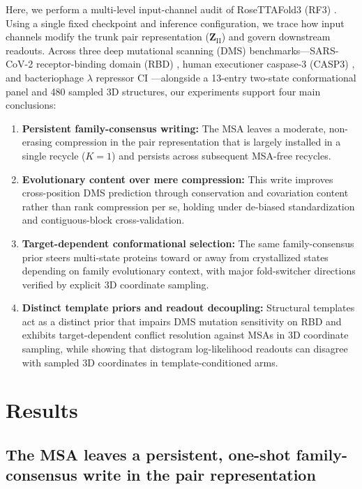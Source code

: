 \documentclass[10pt,a4paper]{article}
\begin{document}
Here, we perform a multi-level input-channel audit of RoseTTAFold3 (RF3) \citep{corley2025atomworks}. Using a single fixed checkpoint and inference configuration, we trace how input channels modify the trunk pair representation ($\mathbf{Z}_{\mathrm{II}}$) and govern downstream readouts. Across three deep mutational scanning (DMS) benchmarks---SARS-CoV-2 receptor-binding domain (RBD) \citep{starr2020deep,lan2020structure}, human executioner caspase-3 (CASP3) \citep{roychowdhury2022microfluidic}, and bacteriophage $\lambda$ repressor CI \citep{notin2023proteingym}---alongside a 13-entry two-state conformational panel \citep{chang2015protein,burmann2012alpha,luo2004mad2,tuinstra2008interconversion,alexander2007design,saldano2022impact} and 480 sampled 3D structures, our experiments support four main conclusions:
\begin{enumerate}
    \setlength{\itemsep}{2pt}\setlength{\parskip}{0pt}
    \item \textbf{Persistent family-consensus writing:} The MSA leaves a moderate, non-erasing compression in the pair representation that is largely installed in a single recycle ($K=1$) and persists across subsequent MSA-free recycles.
    \item \textbf{Evolutionary content over mere compression:} This write improves cross-position DMS prediction through conservation and covariation content rather than rank compression per se, holding under de-biased standardization and contiguous-block cross-validation.
    \item \textbf{Target-dependent conformational selection:} The same family-consensus prior steers multi-state proteins toward or away from crystallized states depending on family evolutionary context, with major fold-switcher directions verified by explicit 3D coordinate sampling.
    \item \textbf{Distinct template priors and readout decoupling:} Structural templates act as a distinct prior that impairs DMS mutation sensitivity on RBD and exhibits target-dependent conflict resolution against MSAs in 3D coordinate sampling, while showing that distogram log-likelihood readouts can disagree with sampled 3D coordinates in template-conditioned arms.
\end{enumerate}

\section{Results}

\subsection{The MSA leaves a persistent, one-shot family-consensus write in the pair representation}
\end{document}
